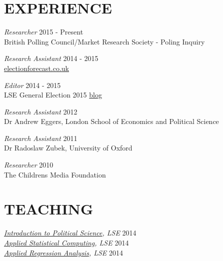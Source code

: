 \documentclass[line,margin]{res}
\begin{document}
\begin{resume}
	
\section{EXPERIENCE} 
{\sl Researcher} \hfill 2015 - Present \\
                 British Polling Council/Market Research Society - Poling Inquiry 
                 
{\sl Research Assistant} \hfill 2014 - 2015 \\
                 \url{electionforecast.co.uk}
	
	{\sl Editor} \hfill 2014 - 2015 \\
                LSE General Election 2015 \href{blogs.lse.ac.uk/generalelection}{blog}
                
{\sl Research Assistant} \hfill 2012 \\
                Dr Andrew Eggers, London School of Economics and Political Science

{\sl Research Assistant} \hfill 2011 \\
                Dr Radoslaw Zubek, University of Oxford
 
                {\sl Researcher} \hfill            2010 \\
                The Childrens Media Foundation 

\section{TEACHING} 	
{\sl\href{http://www.lse.ac.uk/resources/calendar/courseGuides/GV/2015_GV101.htm}{Introduction to Political Science}, LSE} \hfill 2014 \\	
{\sl\href{http://www.lse.ac.uk/resources/calendar/courseGuides/MY/2014_MY459.htm}{Applied Statistical Computing}, LSE} \hfill 2014 \\		
				{\sl\href{http://www.lse.ac.uk/resources/calendar/courseGuides/MY/2014_MY452.htm}{Applied Regression Analysis}, LSE} \hfill 2014 \\		
				

\end{resume}
\end{document}

